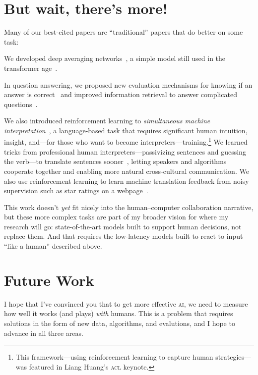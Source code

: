 \documentclass[11pt]{amsart}
\newcommand{\abr}[1]{\textsc{#1}}
\begin{document}
\section{But wait, there's more!}

Many of our best-cited papers are ``traditional'' papers that do
better on some task:
%
\begin{itemize*}
\item We developed deep averaging networks~\cite[\abr{dan}]{iyyer-15}, a simple model still used in the 
transformer age~\cite{ye-22}.

\item In question answering, we proposed new evaluation mechanisms
  for knowing if an answer is correct~\cite{si-21} and improved
  information retrieval to answer complicated
  questions~\cite{elgohary-19,zhao-21,shi-20}.
  
\item We also introduced reinforcement learning to \emph{simultaneous
machine interpretation}~\cite{Grissom:He:Boyd-Graber:Morgan-2014}, a
  language-based task that requires significant human intuition,
  insight, and---for those who want to become
  interpreters---training.\footnote{This framework---using
  reinforcement learning to capture human strategies---was featured in
  Liang Huang's \abr{acl} keynote.} We learned tricks from
  professional human interpreters---passivizing sentences and guessing
  the verb---to translate sentences sooner~\cite{He-15}, letting
  speakers and algorithms cooperate together and enabling more natural
  cross-cultural communication.  We also use reinforcement
  learning to learn machine translation feedback from noisy
  supervision such as star ratings on a webpage~\cite{nguyen-17}.
\end{itemize*}

This work doesn't \emph{yet} fit nicely into the human--computer
collaboration narrative, but these more complex tasks are part of my
broader vision for where my research will go: state-of-the-art models
built to support human decisions, not replace them.  And that requires
the low-latency models built to react to input ``like a human''
described above.

\section{Future Work}

I hope that I've convinced you that to get more effective \abr{ai}, we
need to measure how well it works (and plays) \emph{with} humans.
%
This is a problem that requires solutions in the form of new data, algorithms, and evalutions, and I
hope to advance in all three areas.
\end{document}
